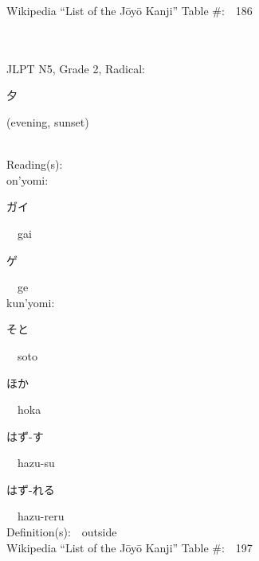 \begin{multicols}{2}
Wikipedia ``List of the J\=oy\=o Kanji'' Table \#:\ \ 186 \\
\ \ \\
{\fontsize{34pt}{40pt}  }\ \ \\  %
{JLPT N5, Grade 2, Radical:\ \ {\begin{CJK}{UTF8}{min} 夕 \end{CJK}} (evening, sunset) } \\
Reading(s):\ \ \\
{\hspace*{1em}}on'yomi:\ \ \\
{\hspace*{2em}}{\begin{CJK}{UTF8}{min} ガイ \end{CJK}}\ \ gai\ \ \\
{\hspace*{2em}}{\begin{CJK}{UTF8}{min} ゲ \end{CJK}}\ \ ge\ \ \\
{\hspace*{1em}}kun'yomi:\ \ \\
{\hspace*{2em}}{\begin{CJK}{UTF8}{min} そと \end{CJK}}\ \ soto\ \ \\
{\hspace*{2em}}{\begin{CJK}{UTF8}{min} ほか \end{CJK}}\ \ hoka\ \ \\
{\hspace*{2em}}{\begin{CJK}{UTF8}{min} はず-す \end{CJK}}\ \ hazu-su\ \ \\
{\hspace*{2em}}{\begin{CJK}{UTF8}{min} はず-れる \end{CJK}}\ \ hazu-reru\ \ \\
Definition(s):\ \ outside \\
Wikipedia ``List of the J\=oy\=o Kanji'' Table \#:\ \ 197 \\
\ \ \\
{\fontsize{34pt}{40pt}  }\ \ \\  %

\end{multicols}
